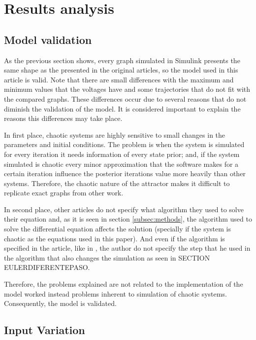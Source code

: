 \section{Results analysis}\label{sec:resultAn}
\subsection{Model validation}
As the previous section shows, every graph simulated in Simulink presents the same shape as the presented in the original articles, so the model used in this article is valid. Note that there are small differences with the maximum and minimum values that the voltages have and some trajectories that do not fit with the compared graphs. These differences occur due to several reasons that do not diminish the validation of the model. It is considered important to explain the reasons this differences may take place.

In first place, chaotic systems are highly sensitive to small changes in the parameters and initial conditions. The problem is when the system is simulated for every iteration it needs information of every state prior; and, if the system simulated is chaotic every minor approximation that the software makes for a certain iteration influence the posterior iterations value more heavily than other systems. Therefore, the chaotic nature of the attractor makes it difficult to replicate exact graphs from other work.

In second place, other articles do not specify what algorithm they used to solve their equation and, as it is seen in section \ref{subsec:methods}, the algorithm used to solve the differential equation affects the solution (specially if the system is chaotic as the equations used in this paper). And even if the algorithm is specified in the article, like in \cite{rossler1976equation}, the author do not specify the step that he used in the algorithm that also changes the simulation as seen in SECTION EULERDIFERENTEPASO.

Therefore, the problems explained are not related to the implementation of the model worked instead problems inherent to simulation of chaotic systems. Consequently, the model is validated. 


\subsection{Input Variation}
